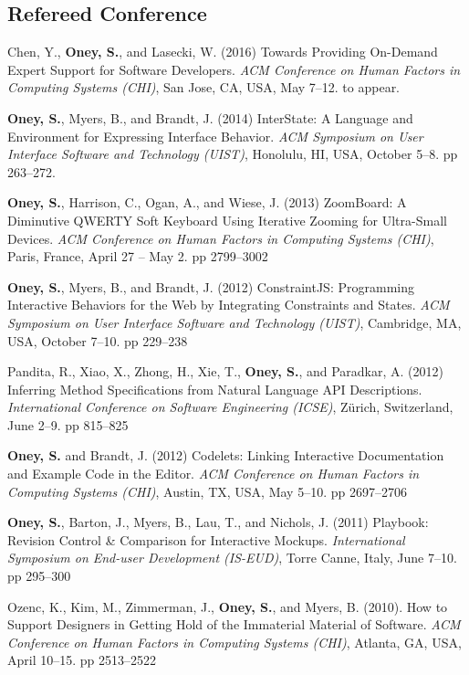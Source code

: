 \subsection{Refereed Conference}

 {
    Chen, Y., \textbf{Oney, S.}, and Lasecki, W. (2016) Towards Providing On-Demand Expert Support for Software Developers. \textit{ACM Conference on Human Factors in Computing Systems (CHI)}, San Jose, CA, USA, May 7--12.  to appear.
}

 {
    \textbf{Oney, S.}, Myers, B., and Brandt, J. (2014) InterState: A Language and Environment for Expressing Interface Behavior. \textit{ACM Symposium on User Interface Software and Technology (UIST)}, Honolulu, HI, USA, October 5--8.  pp 263--272.
}

 {
\textbf{Oney, S.}, Harrison, C., Ogan, A., and Wiese, J. (2013) ZoomBoard: A Diminutive QWERTY Soft Keyboard Using Iterative Zooming for Ultra-Small Devices. \textit{ACM Conference on Human Factors in Computing Systems (CHI)}, Paris, France, April 27 -- May 2. pp 2799--3002
}

 {
\textbf{Oney, S.}, Myers, B., and Brandt, J. (2012) ConstraintJS: Programming Interactive Behaviors for the Web by Integrating Constraints and States. \textit{ACM Symposium on User Interface Software and Technology (UIST)}, Cambridge, MA, USA, October 7--10. pp 229--238
}

 {
Pandita, R., Xiao, X., Zhong, H., Xie, T., \textbf{Oney, S.}, and Paradkar, A. (2012) Inferring Method Specifications from Natural Language API Descriptions. \textit{International Conference on Software Engineering (ICSE)}, Z{\"u}rich, Switzerland, June 2--9. pp 815--825
}

 {
\textbf{Oney, S.} and Brandt, J. (2012) Codelets: Linking Interactive Documentation and Example Code in the Editor. \textit{ACM Conference on Human Factors in Computing Systems (CHI)}, Austin, TX, USA, May 5--10. pp 2697--2706
}

 {
\textbf{Oney, S.}, Barton, J., Myers, B., Lau, T., and Nichols, J. (2011) Playbook: Revision Control \& Comparison for Interactive Mockups. \textit{International Symposium on End-user Development (IS-EUD)}, Torre Canne, Italy, June 7--10. pp 295--300
}

 {
Ozenc, K., Kim, M., Zimmerman, J., \textbf{Oney, S.}, and Myers, B. (2010). How to Support Designers in Getting Hold of the Immaterial Material of Software. \textit{ACM Conference on Human Factors in Computing Systems (CHI)}, Atlanta, GA, USA, April 10--15. pp 2513--2522
}

